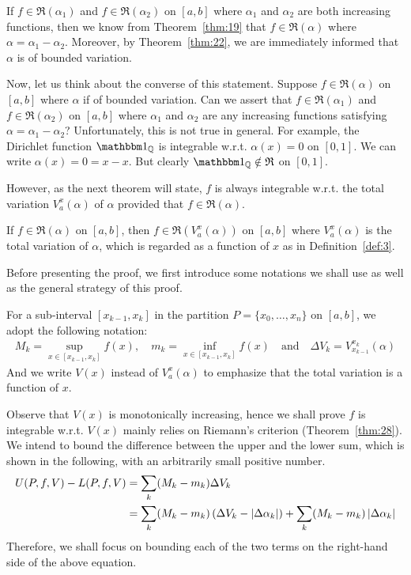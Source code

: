 \documentclass[thmcnt=section, 12pt]{my-elegantbook}
\begin{document}
If $f \in \mathfrak{R}(\alpha_1)$ and $f \in \mathfrak{R}(\alpha_2)$ on $[a, b]$ where $\alpha_1$ and $\alpha_2$ are both increasing functions, then we know from Theorem~\ref{thm:19} that $f \in \mathfrak{R}(\alpha)$ where $\alpha = \alpha_1 - \alpha_2$. Moreover, by Theorem~\ref{thm:22}, we are immediately informed that $\alpha$ is of bounded variation. 

Now, let us think about the converse of this statement. Suppose $f \in \mathfrak{R}(\alpha)$ on $[a, b]$ where $\alpha$ if of bounded variation. Can we assert that $f \in \mathfrak{R}(\alpha_1)$ and $f \in \mathfrak{R}(\alpha_2)$ on $[a, b]$ where $\alpha_1$ and $\alpha_2$ are any increasing functions satisfying $\alpha = \alpha_1 - \alpha_2$? Unfortunately, this is not true in general. For example, the Dirichlet function $\ind_\Q$ is integrable w.r.t. $\alpha(x) = 0$ on $[0, 1]$. We can write $\alpha(x) = 0 = x - x$. But clearly $\ind_\Q \notin \mathfrak{R}$ on $[0, 1]$.

However, as the next theorem will state, $f$ is always integrable 
w.r.t. the total variation $V_a^x(\alpha)$ of $\alpha$ 
provided that $f \in \mathfrak{R}(\alpha)$.

\begin{theorem} \label{thm:37}
    If $f \in \mathfrak{R}(\alpha)$ on $[a, b]$, then $f \in \mathfrak{R}(V_a^x(\alpha))$ on $[a, b]$ where $V_a^x(\alpha)$ is the total variation of $\alpha$, which is regarded as a function of $x$ as in Definition~\ref{def:3}.
\end{theorem}

Before presenting the proof, we first introduce some notations we shall use as well as the general strategy of this proof.

For a sub-interval $[x_{k-1}, x_k]$ in the partition $P = \{ x_0, \ldots, x_n \}$ on $[a, b]$, we adopt the following notation:
\begin{align*}
    M_k = \sup_{x \in [x_{k-1}, x_k]} f(x),
    \quad
    m_k = \inf_{x \in [x_{k-1}, x_k]} f(x)
    \quad\text{and}\quad
    \Delta V_k = V_{x_{k-1}}^{x_k}(\alpha)
\end{align*}
And we write $V(x)$ instead of $V_a^x(\alpha)$ to emphasize that the total variation is a function of $x$.

Observe that $V(x)$ is monotonically increasing, hence we shall prove $f$ is integrable w.r.t. $V(x)$ mainly relies on Riemann's criterion (Theorem~\ref{thm:28}). We intend to bound the difference between the upper and the lower sum, which is shown in the following, with an arbitrarily small positive number.
\begin{align*}
    U(P,f,V) - L(P,f,V)
    &= \sum_k (M_k - m_k) \Delta V_k \\ 
    &= \sum_k (M_k - m_k) \left( \Delta V_k - \left\lvert \Delta\alpha_k \right\rvert \right)
    + \sum_k (M_k - m_k) \left\lvert \Delta\alpha_k \right\rvert
\end{align*}
Therefore, we shall focus on bounding each of the two terms on the right-hand side of the above equation.
\end{document}
